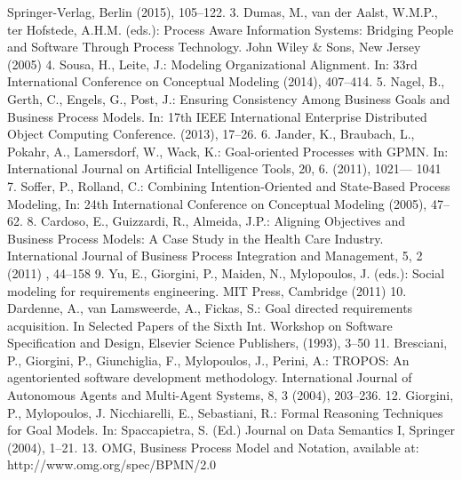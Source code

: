 Springer-Verlag, Berlin (2015), 105--122.
3. Dumas, M., van der Aalst, W.M.P., ter Hofstede, A.H.M. (eds.): Process Aware Information
Systems: Bridging People and Software Through Process Technology. John Wiley & Sons,
New Jersey (2005)
4. Sousa, H., Leite, J.: Modeling Organizational Alignment. In: 33rd International Conference
on Conceptual Modeling (2014), 407--414.
5. Nagel, B., Gerth, C., Engels, G., Post, J.: Ensuring Consistency Among Business Goals and
Business Process Models. In: 17th IEEE International Enterprise Distributed Object Computing Conference. (2013), 17--26.
6. Jander, K., Braubach, L., Pokahr, A., Lamersdorf, W., Wack, K.: Goal-oriented Processes
with GPMN. In: International Journal on Artificial Intelligence Tools, 20, 6. (2011), 1021—
1041
7. Soffer, P., Rolland, C.: Combining Intention-Oriented and State-Based Process Modeling,
In: 24th International Conference on Conceptual Modeling (2005), 47--62.
8. Cardoso, E., Guizzardi, R., Almeida, J.P.: Aligning Objectives and Business Process Models: A Case Study in the Health Care Industry. International Journal of Business Process
Integration and Management, 5, 2 (2011) , 44--158
9. Yu, E., Giorgini, P., Maiden, N., Mylopoulos, J. (eds.): Social modeling for requirements
engineering. MIT Press, Cambridge (2011)
10. Dardenne, A., van Lamsweerde, A., Fickas, S.: Goal directed requirements acquisition. In
Selected Papers of the Sixth Int. Workshop on Software Specification and Design, Elsevier
Science Publishers, (1993), 3--50
11. Bresciani, P., Giorgini, P., Giunchiglia, F., Mylopoulos, J., Perini, A.: TROPOS: An agentoriented software development methodology. International Journal of Autonomous Agents
and Multi-Agent Systems, 8, 3 (2004), 203--236.
12. Giorgini, P., Mylopoulos, J. Nicchiarelli, E., Sebastiani, R.: Formal Reasoning Techniques
for Goal Models. In: Spaccapietra, S. (Ed.) Journal on Data Semantics I, Springer (2004),
1--21.
13. OMG, Business Process Model and Notation, available at:
http://www.omg.org/spec/BPMN/2.0